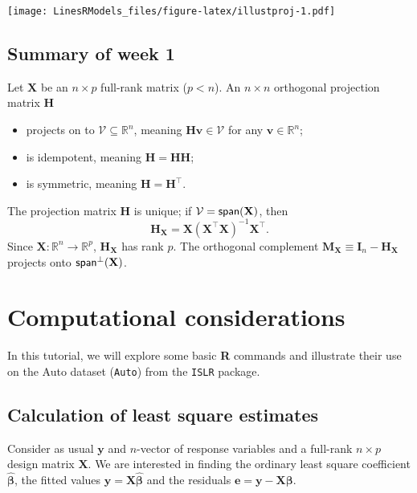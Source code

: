 \documentclass[]{book}
\providecommand{\tightlist}{%
  \setlength{\itemsep}{0pt}\setlength{\parskip}{0pt}}
\theoremstyle{definition}
\theoremstyle{definition}
\theoremstyle{definition}
\theoremstyle{remark}
\begin{document}
\texttt{[image: LinesRModels\_files/figure-latex/illustproj-1.pdf]}

\section{Summary of week 1}\label{summary-of-week-1}

Let \(\mathbf{X}\) be an \(n \times p\) full-rank matrix (\(p <n\)). An
\(n \times n\) orthogonal projection matrix \(\mathbf{H}\)

\begin{itemize}
\tightlist
\item
  projects on to \(\mathcal{V} \subseteq \mathbb{R}^n\), meaning
  \(\mathbf{Hv} \in \mathcal{V}\) for any
  \(\mathbf{v} \in \mathbb{R}^n\);
\item
  is idempotent, meaning \(\mathbf{H} = \mathbf{HH}\);
\item
  is symmetric, meaning \(\mathbf{H} = \mathbf{H}^\top\).
\end{itemize}

The projection matrix \(\mathbf{H}\) is unique; if
\(\mathcal{V} = \mathsf{span}(\mathbf{X})\), then
\[\mathbf{H}_{\mathbf{X}} = \mathbf{X}(\mathbf{X}^\top\mathbf{X})^{-1}\mathbf{X}^\top.\]
Since \(\mathbf{X}: \mathbb{R}^n \to \mathbb{R}^p\),
\(\mathbf{H}_{\mathbf{X}}\) has rank \(p\). The orthogonal complement
\(\mathbf{M}_{\mathbf{X}}\equiv \mathbf{I}_n - \mathbf{H}_{\mathbf{X}}\)
projects onto \(\mathsf{span}^{\perp}(\mathbf{X})\).

\chapter{Computational
considerations}\label{computational-considerations}

In this tutorial, we will explore some basic \textbf{R} commands and
illustrate their use on the Auto dataset (\texttt{Auto}) from the
\texttt{ISLR} package.

\section{Calculation of least square
estimates}\label{calculation-of-least-square-estimates}

Consider as usual \(\boldsymbol{y}\) and \(n\)-vector of response
variables and a full-rank \(n \times p\) design matrix \(\mathbf{X}\).
We are interested in finding the ordinary least square coefficient
\(\hat{\boldsymbol{\beta}}\), the fitted values
\(\hat{\boldsymbol{y}} = \mathbf{X}\hat{\boldsymbol{\beta}}\) and the
residuals
\(\boldsymbol{e} = \boldsymbol{y} - \mathbf{X}\boldsymbol{\beta}\).
\end{document}
